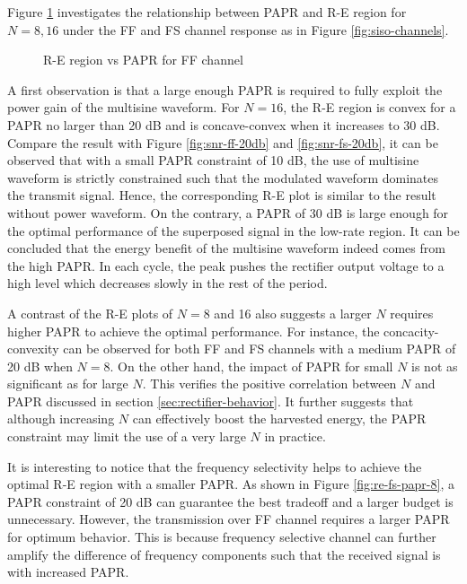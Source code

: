 Figure \ref{fig:re-papr} investigates the relationship between PAPR and R-E region for $N = 8, 16$ under the FF and FS channel response as in Figure \ref{fig:siso-channels}.

\begin{figure}[ht]
  \centering
  \quad
  \caption{R-E region vs PAPR for FF channel}
  \label{fig:re-papr}
\end{figure}

A first observation is that a large enough PAPR is required to fully exploit the power gain of the multisine waveform. For $N = 16$, the R-E region is convex for a PAPR no larger than 20 dB and is concave-convex when it increases to 30 dB. Compare the result with Figure \ref{fig:snr-ff-20db} and \ref{fig:snr-fs-20db}, it can be observed that with a small PAPR constraint of 10 dB, the use of multisine waveform is strictly constrained such that the modulated waveform dominates the transmit signal. Hence, the corresponding R-E plot is similar to the result without power waveform. On the contrary, a PAPR of 30 dB is large enough for the optimal performance of the superposed signal in the low-rate region. It can be concluded that the energy benefit of the multisine waveform indeed comes from the high PAPR. In each cycle, the peak pushes the rectifier output voltage to a high level which decreases slowly in the rest of the period.

A contrast of the R-E plots of $N = 8$ and 16 also suggests a larger $N$ requires higher PAPR to achieve the optimal performance. For instance, the concacity-convexity can be observed for both FF and FS channels with a medium PAPR of 20 dB when $N = 8$. On the other hand, the impact of PAPR for small $N$ is not as significant as for large $N$. This verifies the positive correlation between $N$ and PAPR discussed in section \ref{sec:rectifier-behavior}. It further suggests that although increasing $N$ can effectively boost the harvested energy, the PAPR constraint may limit the use of a very large $N$ in practice.

It is interesting to notice that the frequency selectivity helps to achieve the optimal R-E region with a smaller PAPR. As shown in Figure \ref{fig:re-fs-papr-8}, a PAPR constraint of 20 dB can guarantee the best tradeoff and a larger budget is unnecessary. However, the transmission over FF channel requires a larger PAPR for optimum behavior. This is because frequency selective channel can further amplify the difference of frequency components such that the received signal is with increased PAPR. 


